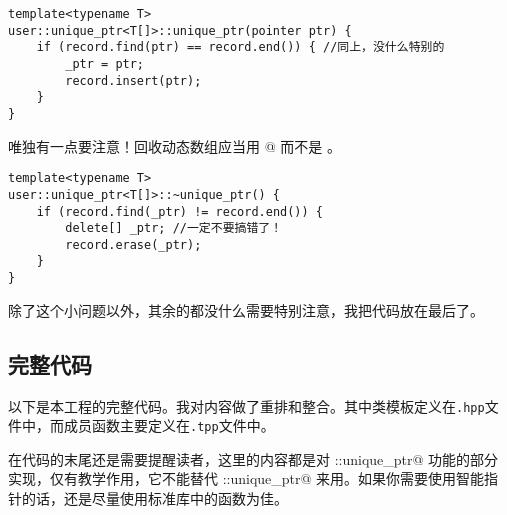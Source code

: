 \begin{lstlisting}
template<typename T>
user::unique_ptr<T[]>::unique_ptr(pointer ptr) {
    if (record.find(ptr) == record.end()) { //同上，没什么特别的
        _ptr = ptr;
        record.insert(ptr);
    }
}
\end{lstlisting}\par
唯独有一点要注意！回收动态数组应当用 \lstinline@delete[]@ 而不是 \lstinline@delete@。
\begin{lstlisting}
template<typename T>
user::unique_ptr<T[]>::~unique_ptr() {
    if (record.find(_ptr) != record.end()) {
        delete[] _ptr; //一定不要搞错了！
        record.erase(_ptr);
    }
}
\end{lstlisting}
除了这个小问题以外，其余的都没什么需要特别注意，我把代码放在最后了。\par
\subsection*{完整代码}
以下是本工程的完整代码。我对内容做了重排和整合。其中类模板定义在\texttt{.hpp}文件中，而成员函数主要定义在\texttt{.tpp}文件中。\par

\par
在代码的末尾还是需要提醒读者，这里的内容都是对 \lstinline@std::unique_ptr@ 功能的部分实现，仅有教学作用，它不能替代 \lstinline@std::unique_ptr@ 来用。如果你需要使用智能指针的话，还是尽量使用标准库中的函数为佳。\par
